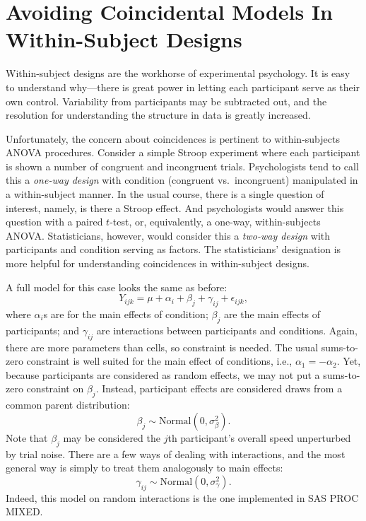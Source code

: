 \documentclass[
  english,
  ,man]{apa6}
\begin{document}
\hypertarget{avoiding-coincidental-models-in-within-subject-designs}{%
\section{Avoiding Coincidental Models In Within-Subject Designs}\label{avoiding-coincidental-models-in-within-subject-designs}}

Within-subject designs are the workhorse of experimental psychology. It is easy to understand why---there is great power in letting each participant serve as their own control. Variability from participants may be subtracted out, and the resolution for understanding the structure in data is greatly increased.

Unfortunately, the concern about coincidences is pertinent to within-subjects ANOVA procedures. Consider a simple Stroop experiment where each participant is shown a number of congruent and incongruent trials. Psychologists tend to call this a \emph{one-way design} with condition (congruent vs.~incongruent) manipulated in a within-subject manner. In the usual course, there is a single question of interest, namely, is there a Stroop effect. And psychologists would answer this question with a paired \(t\)-test, or, equivalently, a one-way, within-subjects ANOVA. Statisticians, however, would consider this a \emph{two-way design} with participants and condition serving as factors. The statisticians' designation is more helpful for understanding coincidences in within-subject designs.

A full model for this case looks the same as before:
\[
Y_{ijk} = \mu+\alpha_i+\beta_j+\gamma_{ij} +\epsilon_{ijk},
\]
where \(\alpha_i\)s are for the main effects of condition; \(\beta_j\) are the main effects of participants; and \(\gamma_{ij}\) are interactions between participants and conditions. Again, there are more parameters than cells, so constraint is needed. The usual sums-to-zero constraint is well suited for the main effect of conditions, i.e., \(\alpha_1=-\alpha_2\). Yet, because participants are considered as random effects, we may not put a sums-to-zero constraint on \(\beta_j\). Instead, participant effects are considered draws from a common parent distribution:
\[
\beta_j \sim \mbox{Normal}(0,\sigma^2_\beta).
\]
Note that \(\beta_j\) may be considered the \(j\)th participant's overall speed unperturbed by trial noise. There are a few ways of dealing with interactions, and the most general way is simply to treat them analogously to main effects:
\[
\gamma_{ij} \sim \mbox{Normal}(0,\sigma^2_\gamma).
\]
Indeed, this model on random interactions is the one implemented in SAS PROC MIXED.
\end{document}
